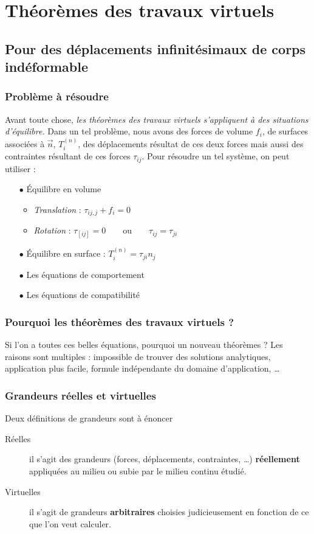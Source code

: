 \chapter{Théorèmes des travaux virtuels}
\section{Pour des déplacements infinitésimaux de corps indéformable}
	\subsection{Problème à résoudre}
	Avant toute chose, \textit{les théorèmes des travaux virtuels s'appliquent
	à des situations d'équilibre.} Dans un tel problème, nous avons des forces 
	de volume $f_i$, de surfaces associées à $\vec{n}$, $T_i^{(n)}$, des 
	déplacements résultat de ces deux forces mais aussi des contraintes 
	résultant de ces forces $\tau_{ij}$. Pour résoudre un tel système, on peut 
	utiliser :
	\begin{itemize}
	\item[$\bullet$] Équilibre en volume
		\begin{itemize}
		\item \textit{Translation} : $\tau_{ij,j}+f_i = 0$
		\item \textit{Rotation} : $\tau_{[ij]} =0\qquad\text{ou}\qquad \tau_{ij}=
		\tau_{ji}$
		\end{itemize}
	\item[$\bullet$] Équilibre en surface : $T_i^{(n)} = \tau_{ji}n_j$
	\item[$\bullet$] Les équations de comportement
	\item[$\bullet$] Les équations de compatibilité
	\end{itemize}

	\subsection{Pourquoi les théorèmes des travaux virtuels ?}
	Si l'on a toutes ces belles équations, pourquoi un nouveau théorèmes ? Les 
	raisons sont multiples : impossible de trouver des solutions analytiques, 
	application plus facile, formule indépendante du domaine d'application, 
	\dots
	
	\subsection{Grandeurs réelles et virtuelles}
	Deux définitions de grandeurs sont à énoncer 
	\begin{description}
	\item[Réelles] il s'agit des grandeurs (forces, déplacements, contraintes, 
	\dots) \textbf{réellement} appliquées au milieu ou subie par le milieu 
	continu étudié.
	\item[Virtuelles] il s'agit de grandeurs \textbf{arbitraires} choisies 
	judicieusement en fonction de ce que l'on veut calculer.
	\end{description}
	
